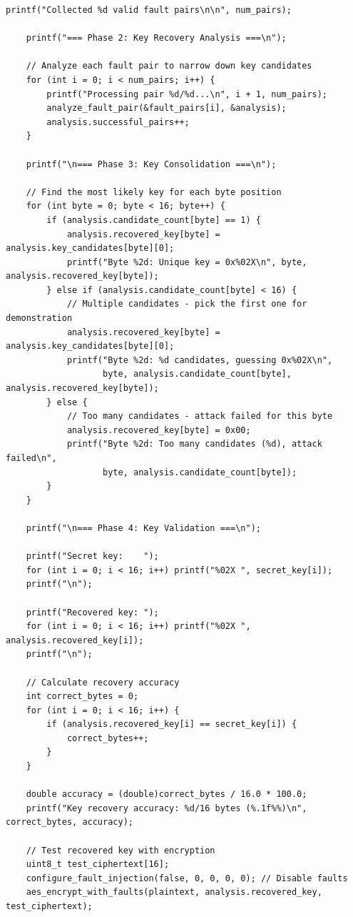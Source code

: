 \documentclass[12pt,a4paper]{article}
\begin{document}
\begin{lstlisting}[caption={Complete DFA Key Recovery Attack}]
    printf("Collected %d valid fault pairs\n\n", num_pairs);
    
    printf("=== Phase 2: Key Recovery Analysis ===\n");
    
    // Analyze each fault pair to narrow down key candidates
    for (int i = 0; i < num_pairs; i++) {
        printf("Processing pair %d/%d...\n", i + 1, num_pairs);
        analyze_fault_pair(&fault_pairs[i], &analysis);
        analysis.successful_pairs++;
    }
    
    printf("\n=== Phase 3: Key Consolidation ===\n");
    
    // Find the most likely key for each byte position
    for (int byte = 0; byte < 16; byte++) {
        if (analysis.candidate_count[byte] == 1) {
            analysis.recovered_key[byte] = analysis.key_candidates[byte][0];
            printf("Byte %2d: Unique key = 0x%02X\n", byte, analysis.recovered_key[byte]);
        } else if (analysis.candidate_count[byte] < 16) {
            // Multiple candidates - pick the first one for demonstration
            analysis.recovered_key[byte] = analysis.key_candidates[byte][0];
            printf("Byte %2d: %d candidates, guessing 0x%02X\n", 
                   byte, analysis.candidate_count[byte], analysis.recovered_key[byte]);
        } else {
            // Too many candidates - attack failed for this byte
            analysis.recovered_key[byte] = 0x00;
            printf("Byte %2d: Too many candidates (%d), attack failed\n", 
                   byte, analysis.candidate_count[byte]);
        }
    }
    
    printf("\n=== Phase 4: Key Validation ===\n");
    
    printf("Secret key:    ");
    for (int i = 0; i < 16; i++) printf("%02X ", secret_key[i]);
    printf("\n");
    
    printf("Recovered key: ");
    for (int i = 0; i < 16; i++) printf("%02X ", analysis.recovered_key[i]);
    printf("\n");
    
    // Calculate recovery accuracy
    int correct_bytes = 0;
    for (int i = 0; i < 16; i++) {
        if (analysis.recovered_key[i] == secret_key[i]) {
            correct_bytes++;
        }
    }
    
    double accuracy = (double)correct_bytes / 16.0 * 100.0;
    printf("Key recovery accuracy: %d/16 bytes (%.1f%%)\n", correct_bytes, accuracy);
    
    // Test recovered key with encryption
    uint8_t test_ciphertext[16];
    configure_fault_injection(false, 0, 0, 0, 0); // Disable faults
    aes_encrypt_with_faults(plaintext, analysis.recovered_key, test_ciphertext);
    

\end{lstlisting}
\end{document}
